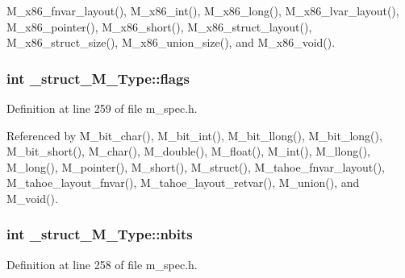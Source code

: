 M\_\-x86\_\-fnvar\_\-layout(), M\_\-x86\_\-int(), M\_\-x86\_\-long(), M\_\-x86\_\-lvar\_\-layout(), M\_\-x86\_\-pointer(), M\_\-x86\_\-short(), M\_\-x86\_\-struct\_\-layout(), M\_\-x86\_\-struct\_\-size(), M\_\-x86\_\-union\_\-size(), and M\_\-x86\_\-void().
\subsubsection{\setlength{\rightskip}{0pt plus 5cm}int \bf{\_\-struct\_\-M\_\-Type::flags}}\label{struct__struct__M__Type_2a7f6ea4c6240677beede3da9ed37439}




Definition at line 259 of file m\_\-spec.h.

Referenced by M\_\-bit\_\-char(), M\_\-bit\_\-int(), M\_\-bit\_\-llong(), M\_\-bit\_\-long(), M\_\-bit\_\-short(), M\_\-char(), M\_\-double(), M\_\-float(), M\_\-int(), M\_\-llong(), M\_\-long(), M\_\-pointer(), M\_\-short(), M\_\-struct(), M\_\-tahoe\_\-fnvar\_\-layout(), M\_\-tahoe\_\-layout\_\-fnvar(), M\_\-tahoe\_\-layout\_\-retvar(), M\_\-union(), and M\_\-void().
\subsubsection{\setlength{\rightskip}{0pt plus 5cm}int \bf{\_\-struct\_\-M\_\-Type::nbits}}\label{struct__struct__M__Type_b566ee5b3ce948c5097e564243cfa6f3}




Definition at line 258 of file m\_\-spec.h.

